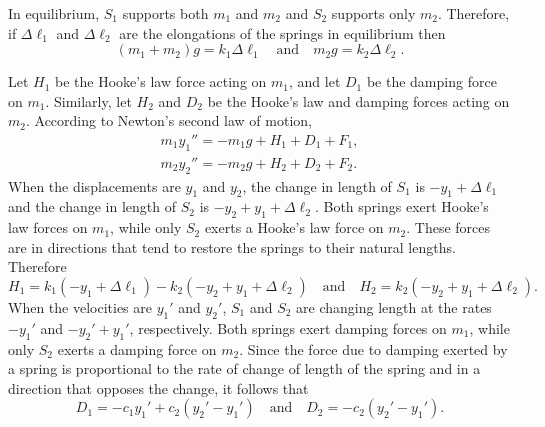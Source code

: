 \documentclass{ximera}
\begin{document}
\begin{example}
\begin{explanation}
In equilibrium, $S_1$ supports both $m_1$ and $m_2$ and $S_2$ supports
only $m_2$. Therefore, if $\Delta\ell_1$ and $\Delta\ell_2$ are the
elongations of the springs in equilibrium then
\begin{equation} \label{eq:10.1.7}
(m_1+m_2)g=k_1\Delta\ell_1\quad\mbox{and}\quad m_2g=k_2\Delta\ell_2.
\end{equation}

Let $H_1$ be the Hooke's law force acting on $m_1$, and let $D_1$ be
the damping force on $m_1$. Similarly, let $H_2$ and $D_2$ be the
Hooke's law and damping forces acting on $m_2$. According to Newton's
second law of motion,
\begin{equation} \label{eq:10.1.8}
\begin{array}{ccl}
m_1y_1''=-m_1g+H_1+D_1+F_1,\\
m_2y_2''=-m_2g+H_2+D_2+F_2.
\end{array}
\end{equation}
When the displacements are $y_1$ and $y_2$, the change in length of
$S_1$ is $-y_1+\Delta\ell_1$ and the change in length of $S_2$ is
$-y_2+y_1+\Delta\ell_2$. Both springs exert Hooke's law forces on $m_1$,
while only $S_2$ exerts a Hooke's law force on $m_2$. These forces are
in directions that tend to restore the springs to their natural
lengths. Therefore
\begin{equation} \label{eq:10.1.9}
H_1=k_1(-y_1+\Delta\ell_1)-k_2(-y_2+y_1+\Delta\ell_2)\quad\mbox{and}\quad H_2=k_2(-y_2+y_1+\Delta\ell_2).
\end{equation}
When the velocities are $y_1'$ and $y_2'$,  $S_1$ and $S_2$ are
changing length at the rates $-y_1'$ and $-y_2'+y_1'$, respectively.
Both springs exert damping forces on $m_1$, while only $S_2$ exerts a
damping force on $m_2$. Since the force due to damping exerted by a
spring is proportional to the rate of change of length of the spring
and in a direction that opposes the change, it follows that
\begin{equation} \label{eq:10.1.10}
D_1=-c_1y_1'+c_2(y_2'-y_1')\quad\mbox{and}\quad
D_2=-c_2(y_2'-y_1').
\end{equation}


\end{explanation}
\end{example}
\end{document}
